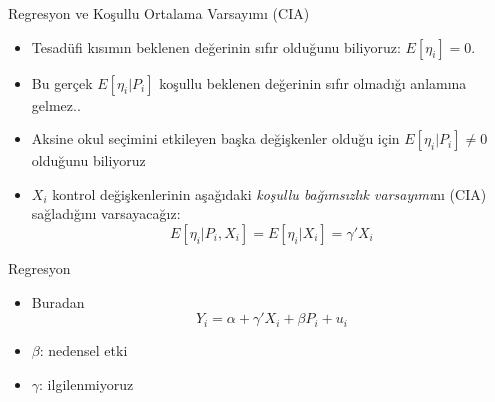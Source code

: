 \documentclass[
  12pt,
  ignorenonframetext,
  fleqn,
  aspectratio=43]{beamer}
\providecommand{\tightlist}{%
  \setlength{\itemsep}{0pt}\setlength{\parskip}{0pt}}
\let\olditem\item
\renewcommand{\item}{\olditem\vspace{\fill}}
\begin{document}
\begin{frame}{Regresyon ve Koşullu Ortalama Varsayımı (CIA)}
\protect\hypertarget{regresyon-ve-koux15fullu-ortalama-varsayux131mux131-cia}{}
\begin{itemize}
\tightlist
\item
  Tesadüfi kısımın beklenen değerinin sıfır olduğunu biliyoruz:
  \(E[\eta_i]=0\).
\item
  Bu gerçek \(E[\eta_i|P_i]\) koşullu beklenen değerinin sıfır olmadığı
  anlamına \alert{gelmez.}.
\item
  Aksine okul seçimini etkileyen başka değişkenler olduğu için
  \(E[\eta_i|P_i]\neq 0\) olduğunu biliyoruz
\item
  \(X_i\) kontrol değişkenlerinin aşağıdaki \emph{koşullu bağımsızlık
  varsayımı}nı (CIA) sağladığını varsayacağız:
  \[E[\eta_i|P_i,X_i]=E[\eta_i|X_i]=\gamma'X_i\]
\end{itemize}
\end{frame}

\begin{frame}{Regresyon}
\protect\hypertarget{regresyon}{}
\begin{itemize}
\item
  Buradan \[Y_i=\alpha+\gamma'X_i+\beta P_i+u_i\]
\item
  \(\beta\): nedensel etki
\item
  \(\gamma\): ilgilenmiyoruz
\end{itemize}
\end{frame}
\end{document}
